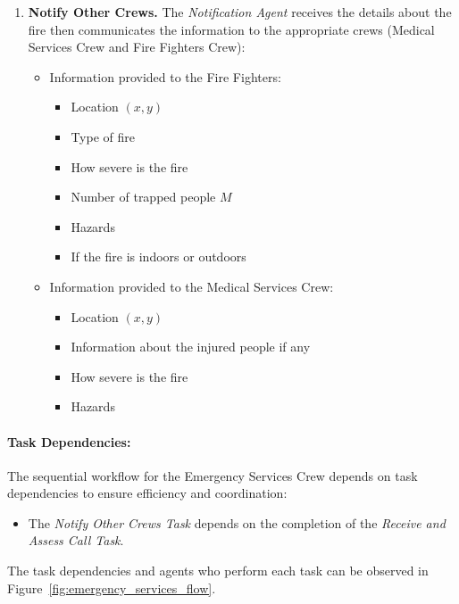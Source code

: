 \begin{enumerate}
    \item \textbf{Notify Other Crews.} 
    The \textit{Notification Agent} receives the details about the fire then communicates the information to the 
    appropriate crews (Medical Services Crew and Fire Fighters Crew):
    \begin{itemize}
        \item Information provided to the Fire Fighters:
        \begin{itemize}
            \item Location \((x, y)\)
            \item Type of fire
            \item How severe is the fire 
            \item Number of trapped people $M$
            \item Hazards
            \item If the fire is indoors or outdoors
        \end{itemize}
        \item Information provided to the Medical Services Crew:
        \begin{itemize}
            \item Location \((x, y)\)
            \item Information about the injured people if any
            \item How severe is the fire 
            \item Hazards
        \end{itemize}
    \end{itemize}

\end{enumerate}

\paragraph{Task Dependencies:}

The sequential workflow for the Emergency Services Crew depends on task dependencies to ensure efficiency and coordination:
\begin{itemize}
    \item The \textit{Notify Other Crews Task} depends on the completion of the \textit{Receive and Assess Call Task}.
\end{itemize}

The task dependencies and agents who perform each task can be observed in Figure~\ref{fig:emergency_services_flow}.

